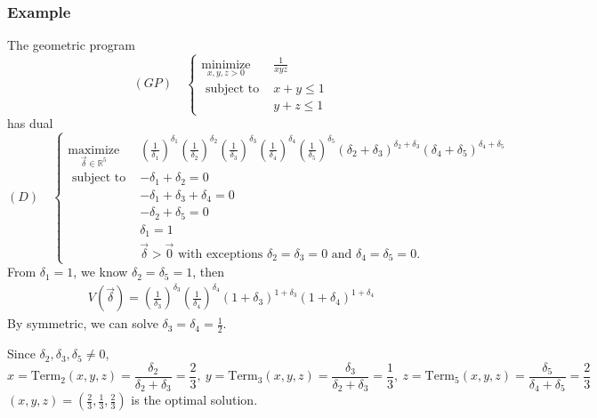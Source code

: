 \documentclass[11pt,a4paper]{article}
\begin{document}
\subsubsection*{Example}
The geometric program
$$
(G P) \quad\left\{\begin{array}{cl}
\underset{x, y, z>0}{\operatorname{minimize}} & \frac{1}{x y z} \\
\text { subject to } & x+y \leq 1 \\
& y+z \leq 1
\end{array}\right.
$$
has dual
$$ (D)\quad
\left\{\begin{aligned}
\underset{\vec{\delta} \in \mathbb{R}^5}{\operatorname{maximize}} &\left(\frac{1}{\delta_1}\right)^{\delta_1}\left(\frac{1}{\delta_2}\right)^{\delta_2}\left(\frac{1}{\delta_3}\right)^{\delta_3}\left(\frac{1}{\delta_4}\right)^{\delta_4}\left(\frac{1}{\delta_5}\right)^{\delta_5}\left(\delta_2+\delta_3\right)^{\delta_2+\delta_3}\left(\delta_4+\delta_5\right)^{\delta_4+\delta_5} \\
\text { subject to } &-\delta_1+\delta_2=0 \\
&-\delta_1+\delta_3+\delta_4=0 \\
&-\delta_2+\delta_5=0 \\
& \delta_1=1 \\
& \vec{\delta}>\vec{0} \text { with exceptions } \delta_2=\delta_3=0 \text { and } \delta_4=\delta_5=0 .
\end{aligned}\right.
$$
From $\delta_1=1$, we know $\delta_2=\delta_5=1$, then
\begin{equation}
    \begin{aligned}
        V(\vec{\delta})=\left(\frac{1}{\delta_3}\right)^{\delta_3}\left(\frac{1}{\delta_4}\right)^{\delta_4}(1+\delta_3)^{1+\delta_3}(1+\delta_4)^{1+\delta_4}
    \end{aligned}
    \nonumber
\end{equation}
By symmetric, we can solve $\delta_3=\delta_4=\frac{1}{2}$.

Since $\delta_2,\delta_3, \delta_5\neq 0$,
$$x=\text{Term}_2(x,y,z)=\frac{\delta_2}{\delta_2+\delta_3}=\frac{2}{3},\ y=\text{Term}_3(x,y,z)=\frac{\delta_3}{\delta_2+\delta_3}=\frac{1}{3},\ z=\text{Term}_5(x,y,z)=\frac{\delta_5}{\delta_4+\delta_5}=\frac{2}{3}$$
$(x,y,z)=(\frac{2}{3},\frac{1}{3},\frac{2}{3})$ is the optimal solution.
\end{document}
